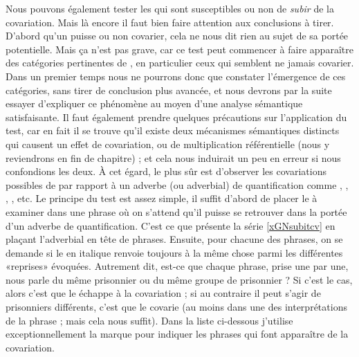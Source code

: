 Nous pouvons également tester les {\GN} qui sont susceptibles ou non de \emph{subir} de la covariation. Mais là encore il faut bien faire attention aux conclusions à tirer. D'abord qu'un {\GN} puisse ou non covarier, cela ne nous dit rien au sujet de sa portée potentielle.  Mais ça n'est pas grave, car ce test peut commencer à faire apparaître des catégories pertinentes de {\GN}, en particulier ceux qui semblent ne jamais covarier. Dans un premier temps nous ne pourrons donc que constater l'émergence de ces catégories, sans tirer de conclusion plus avancée, et nous devrons par la suite essayer d'expliquer ce phénomène au moyen d'une analyse sémantique satisfaisante.
Il faut également prendre quelques précautions sur l'application du test, car en fait il se trouve qu'il existe deux mécanismes sémantiques distincts qui causent un effet de covariation, ou de multiplication référentielle (nous y reviendrons en fin de chapitre) ; et cela nous induirait un peu en erreur si nous confondions les deux.  À cet égard, le plus sûr est d'observer les covariations possibles de {\GN} par rapport à un adverbe (ou adverbial) de quantification comme , , , , etc. 
Le principe du test est assez simple, il suffit d'abord de placer le {\GN} à examiner dans une phrase où on s'attend qu'il puisse se retrouver dans la portée d'un adverbe de quantification. C'est ce que présente la série \ref{xGNsubitcv} en plaçant l'adverbial  en tête de phrases. Ensuite, pour chacune des phrases, on se demande si le {\GN} en italique renvoie toujours à la même chose parmi les différentes «reprises» évoquées. Autrement dit, est-ce que chaque phrase, prise une par une, nous parle du même prisonnier ou du même groupe de prisonnier ? Si c'est le cas, alors c'est que le {\GN} échappe à la covariation ; si au contraire il peut s'agir de prisonniers différents, c'est que le {\GN} covarie (au moins dans une des interprétations de la phrase ; mais cela nous suffit). 
Dans la liste ci-dessous j'utilise exceptionnellement la marque {\mcovar} pour 
indiquer les phrases qui font apparaître de la covariation.


